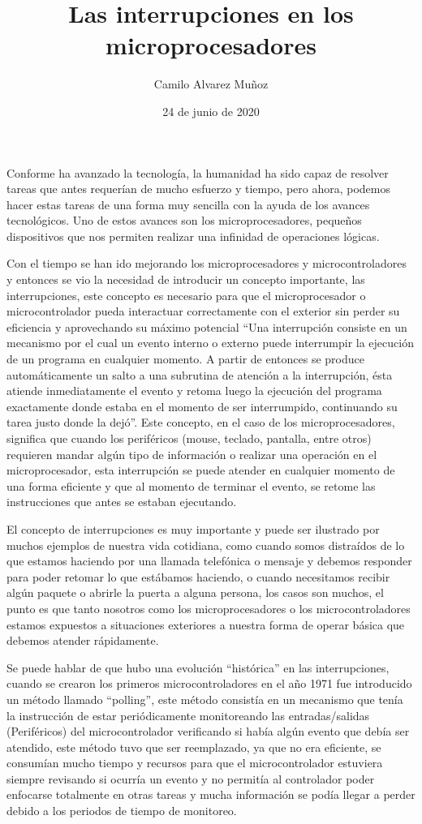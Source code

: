 \documentclass[11pt]{article}
\title{Las interrupciones en los microprocesadores}
\author{Camilo Alvarez Muñoz}
\date{24 de junio de 2020}
\begin{document}
{
\maketitle}
Conforme ha avanzado la tecnología, la humanidad ha sido capaz de resolver tareas que antes requerían de mucho esfuerzo y tiempo, pero ahora, podemos hacer estas tareas de una forma muy sencilla con la ayuda de los avances tecnológicos. Uno de estos avances son los microprocesadores, pequeños dispositivos que nos permiten realizar una infinidad de operaciones lógicas.

Con el tiempo se han ido mejorando los microprocesadores y microcontroladores y entonces se vio la necesidad de introducir un concepto importante, las interrupciones, este concepto es necesario para que el microprocesador o microcontrolador pueda interactuar correctamente con el exterior sin perder su eficiencia y aprovechando su máximo potencial “Una interrupción consiste en un mecanismo por el cual un evento interno o externo puede interrumpir la ejecución de un programa en cualquier momento. A partir de entonces se produce automáticamente un salto a una subrutina de atención a la interrupción, ésta atiende inmediatamente el evento y retoma luego la ejecución del programa exactamente donde estaba en el momento de ser interrumpido, continuando su tarea justo donde la dejó”\cite{apaza2017microcontroladores}. Este concepto, en el caso de los microprocesadores, significa que cuando los periféricos (mouse, teclado, pantalla, entre otros) requieren mandar algún tipo de información o realizar una operación en el microprocesador, esta interrupción se puede atender en cualquier momento de una forma eficiente y que al momento de terminar el evento, se retome las instrucciones que antes se estaban ejecutando.

El concepto de interrupciones es muy importante y puede ser ilustrado por muchos ejemplos de nuestra vida cotidiana, como cuando somos distraídos de lo que estamos haciendo por una llamada telefónica o mensaje y debemos responder para poder retomar lo que estábamos haciendo, o cuando necesitamos recibir algún paquete o abrirle la puerta a alguna persona, los casos son muchos, el punto es que tanto nosotros como los microprocesadores o los microcontroladores estamos expuestos a situaciones exteriores a nuestra forma de operar básica que debemos atender rápidamente.

Se puede hablar de que hubo una evolución “histórica” en las interrupciones, cuando se crearon los primeros microcontroladores en el año 1971 fue introducido un método llamado “polling”, este método consistía en un mecanismo que tenía la instrucción de estar periódicamente monitoreando las entradas/salidas (Periféricos) del microcontrolador verificando si había algún evento que debía ser atendido, este método tuvo que ser reemplazado, ya que no era eficiente, se consumían mucho tiempo y recursos para que el microcontrolador estuviera siempre revisando si ocurría un evento y no permitía al controlador poder enfocarse totalmente en otras tareas y mucha información se podía llegar a perder debido a los periodos de tiempo de monitoreo\cite{reyes2015arduino}.
\end{document}
